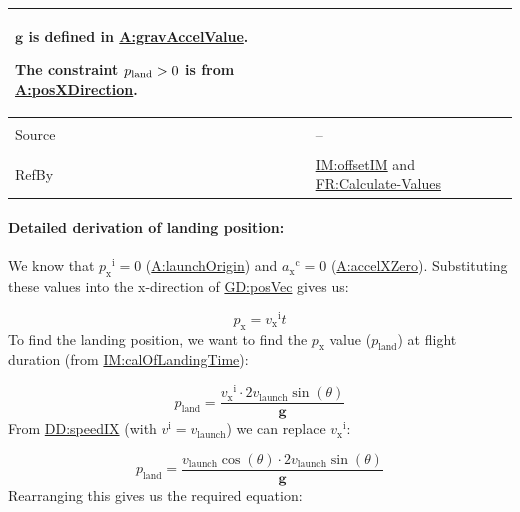 \documentclass[12pt]{article}
\newcommand{\gt}{\ensuremath >}
\begin{document}
\begin{minipage}{\textwidth}
\begin{tabular}{>{\raggedright}p{}>{\raggedright\arraybackslash}p{}}
        $\symbf{g}$ is defined in \hyperref[gravAccelValue]{A:gravAccelValue}.
        
        The constraint ${p_{\text{land}}}\gt{}0$ is from \hyperref[posXDirection]{A:posXDirection}.
        
\\ \midrule \\
Source & --
         
\\ \midrule \\
RefBy & \hyperref[IM:offsetIM]{IM:offsetIM} and \hyperref[calcValues]{FR:Calculate-Values}
        
\\ \bottomrule
\end{tabular}
\end{minipage}
\paragraph{Detailed derivation of landing position:}
\label{IM:calOfLandingDistDeriv}
We know that ${{p_{\text{x}}}^{\text{i}}}=0$ (\hyperref[launchOrigin]{A:launchOrigin}) and ${{a_{\text{x}}}^{\text{c}}}=0$ (\hyperref[accelXZero]{A:accelXZero}). Substituting these values into the x-direction of \hyperref[GD:posVec]{GD:posVec} gives us:

\begin{displaymath}
{p_{\text{x}}}={{v_{\text{x}}}^{\text{i}}} t
\end{displaymath}
To find the landing position, we want to find the ${p_{\text{x}}}$ value (${p_{\text{land}}}$) at flight duration (from \hyperref[IM:calOfLandingTime]{IM:calOfLandingTime}):

\begin{displaymath}
{p_{\text{land}}}=\frac{{{v_{\text{x}}}^{\text{i}}}\cdot{}2 {v_{\text{launch}}} \sin\left(θ\right)}{\symbf{g}}
\end{displaymath}
From \hyperref[DD:speedIX]{DD:speedIX} (with ${v^{\text{i}}}={v_{\text{launch}}}$) we can replace ${{v_{\text{x}}}^{\text{i}}}$:

\begin{displaymath}
{p_{\text{land}}}=\frac{{v_{\text{launch}}} \cos\left(θ\right)\cdot{}2 {v_{\text{launch}}} \sin\left(θ\right)}{\symbf{g}}
\end{displaymath}
Rearranging this gives us the required equation:
\end{document}
